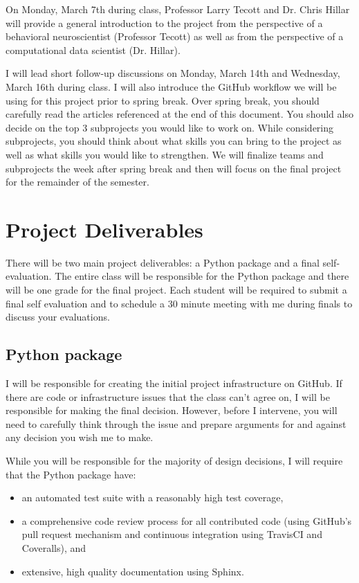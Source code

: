 \documentclass[11pt, oneside]{article}   	%
\begin{document}
On Monday, March 7th during class, Professor Larry Tecott and Dr. Chris Hillar
will provide a general introduction to the project from the perspective of a
behavioral neuroscientist (Professor Tecott) as well as from the perspective of
a computational data scientist (Dr. Hillar).  

I will lead short follow-up discussions on Monday, March 14th and Wednesday,
March 16th during class.  I will also introduce the GitHub workflow we will be
using for this project prior to spring break.  Over spring break, you should
carefully read the articles referenced at the end of this document.  You should
also decide on the top 3 subprojects you would like to work on. While
considering subprojects, you should think about what skills you can bring to
the project as well as what skills you would like to strengthen.  We will
finalize teams and subprojects the week after spring break and then will focus
on the final project for the remainder of the semester.

\section{Project Deliverables}

There will be two main project deliverables: a Python package and a
final self-evaluation.  The entire class will be responsible for
the Python package and there will be one grade for the final project.
Each student will be required to submit a final self evaluation
and to schedule a 30 minute meeting with me during finals to discuss
your evaluations.

\subsection{Python package}

I will be responsible for creating the initial project infrastructure
on GitHub.  If there are code or infrastructure issues that the
class can't agree on, I will be responsible for making the final
decision.  However, before I intervene, you will need to carefully
think through the issue and prepare arguments for and against
any decision you wish me to make.

While you will be responsible for the majority of design decisions,
I will require that the Python package have:

\begin{itemize}
\item an automated test suite with a reasonably high test coverage,
\item a comprehensive code review process for all contributed code (using
   GitHub's pull request mechanism and continuous integration using
   TravisCI and Coveralls), and
\item extensive, high quality documentation using Sphinx.
\end{itemize}
\end{document}
